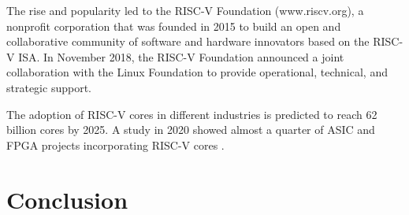 \documentclass[journal]{IEEEtran}
\begin{document}
The rise and popularity led to the RISC-V Foundation (www.riscv.org), a nonprofit corporation that was founded in 2015 to build an open and collaborative community of software and hardware innovators based on the RISC-V ISA. In November 2018, the RISC-V Foundation announced a joint collaboration with the Linux Foundation to provide operational, technical, and strategic support.

The adoption of RISC-V cores in different industries is predicted to reach 62 billion cores by 2025. A study in 2020 showed almost a quarter of ASIC and FPGA projects incorporating RISC-V cores \cite{redmond_risc-v_2021}.

\section{Conclusion}








\end{document}
